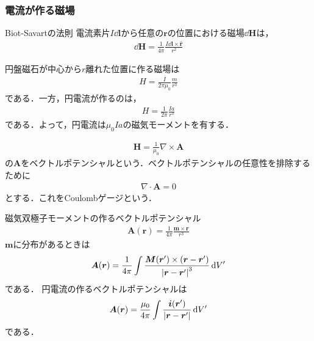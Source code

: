 \documentclass{report}
\begin{document}
  \subsubsection{電流が作る磁場}
  \begin{itembox}[l]{Biot-Savartの法則}
    電流素片$I\dd{\bm{l}}$から任意の$\bm{r}$の位置における磁場$\dd{\bm{H}}$は，
    \begin{align}
      \dd{\bm{H}} = \frac{1}{4\pi}\frac{I\dd{\bm{l}} \times \hat{\bm{r}}}{r^2}
    \end{align}
  \end{itembox}

  円盤磁石が中心から$r$離れた位置に作る磁場は
  \begin{align}
    H = \frac{I}{2\pi\mu_0}\frac{m}{r^3}
  \end{align}
  である．一方，円電流が作るのは，
  \begin{align}
    H = \frac{1}{2\pi}\frac{Ia}{r^3}
  \end{align}
  である．よって，円電流は$\mu_0 Ia$の磁気モーメントを有する．

  \begin{align}
    \bm{H} = \frac{1}{\mu_0}\nabla \times \bm{A}
  \end{align}
  の$\bm{A}$をベクトルポテンシャルという．ベクトルポテンシャルの任意性を排除するために
  \begin{align}
    \nabla \cdot \bm{A} = 0
  \end{align}
  とする．これをCoulombゲージという．

  磁気双極子モーメントの作るベクトルポテンシャル
  \begin{align}
    \bm{A}(\bm{r}) = \frac{1}{4\pi}\frac{\bm{m}\times\bm{r}}{r^3}
  \end{align}
  $\bm{m}$に分布があるときは
  \begin{align}
    \bm{A}(\bm{r}) = \frac{1}{4\pi} \int \frac{\bm{M}(\bm{r}')\times(\bm{r}-\bm{r}')}{\abs{\bm{r}-\bm{r}'}^3}\dd{V'}
  \end{align}
  である．
  円電流の作るベクトルポテンシャルは
  \begin{align}
    \bm{A}(\bm{r}) = \frac{\mu_0}{4\pi} \int \frac{\bm{i}(\bm{r}')}{\abs{\bm{r}-\bm{r}'}}\dd{V'}
  \end{align}
  である．
\end{document}
